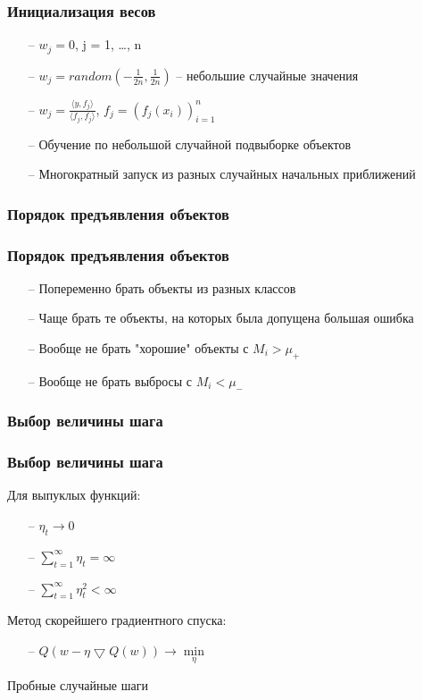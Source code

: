 \documentclass[12pt]{beamer}
\begin{document}
\begin{frame}\frametitle{Инициализация весов}
\begin{itemize}
\item[--] $w_j = 0$, j = 1, \dots, n
\item[--] $w_j = random(-\frac{1}{2n}, \frac{1}{2n})$ -- небольшие случайные значения
\item[--] $w_j = \frac{\langle y, f_j \rangle}{\langle f_j, f_j \rangle}$, $f_j = (f_j(x_i))_{i = 1}^n$
\item[--] Обучение по небольшой случайной подвыборке объектов
\item[--] Многократный запуск из разных случайных начальных приближений
\end{itemize}

\end{frame}

\begin{frame}\frametitle{Порядок предъявления объектов}

\end{frame}

\begin{frame}\frametitle{Порядок предъявления объектов}
\begin{itemize}
\item[--] Попеременно брать объекты из разных классов
\item[--] Чаще брать те объекты, на которых была допущена большая ошибка
\item[--] Вообще не брать "хорошие" объекты с $M_i > \mu_+$
\item[--] Вообще не брать выбросы с $M_i < \mu_-$
\end{itemize}
\end{frame}

\begin{frame}\frametitle{Выбор величины шага}

\end{frame}

\begin{frame}\frametitle{Выбор величины шага}
Для выпуклых функций:
\begin{itemize}
\item[--] $\eta_t \rightarrow 0$
\item[--] $\sum\limits_{t = 1}^\infty \eta_t = \infty$
\item[--] $\sum\limits_{t = 1}^\infty \eta_t^2 < \infty$
\end{itemize}
Метод скорейшего градиентного спуска:
\begin{itemize}
\item[--] 
$Q(w - \eta \bigtriangledown Q(w)) \rightarrow \min\limits_{\eta}$
\end{itemize}
Пробные случайные шаги
\end{frame}
\end{document}
